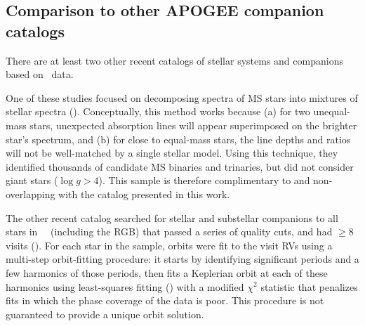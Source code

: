 \documentclass[modern, letterpaper]{aastex62}
\newcommand{\apogee}{\project{\acronym{APOGEE}}}
\newcommand{\DRtw}{\acronym{DR12}}
\newcommand{\logg}{\ensuremath{\log g}}
\begin{document}
\subsection{Comparison to other APOGEE companion catalogs}
\label{sec:compare-troup}

There are at least two other recent catalogs of stellar systems and companions
based on \apogee\ data.

One of these studies focused on decomposing spectra of MS stars into mixtures of
stellar spectra (\citealt{El-Badry:2018}).
Conceptually, this method works because (a) for two unequal-mass stars,
unexpected absorption lines will appear superimposed on the brighter star's
spectrum, and (b) for close to equal-mass stars, the line depths and ratios will
not be well-matched by a single stellar model.
Using this technique, they identified thousands of candidate MS binaries and
trinaries, but did not consider giant stars ($\logg > 4$).
This sample is therefore complimentary to and non-overlapping with the catalog
presented in this work.

The other recent catalog searched for stellar and substellar companions to all
stars in \apogee\ \DRtw\ (including the RGB) that passed a series of quality
cuts, and had $\geq 8$ visits (\citealt{Troup:2016}).
For each star in the sample, orbits were fit to the visit RVs using a multi-step
orbit-fitting procedure: it starts by identifying significant periods and a few
harmonics of those periods, then fits a Keplerian orbit at each of these
harmonics using least-squares fitting (\citealt{De-Lee:2013}) with a modified
$\chi^2$ statistic that penalizes fits in which the phase coverage of the data
is poor.
This procedure is not guaranteed to provide a unique orbit solution.
\end{document}

